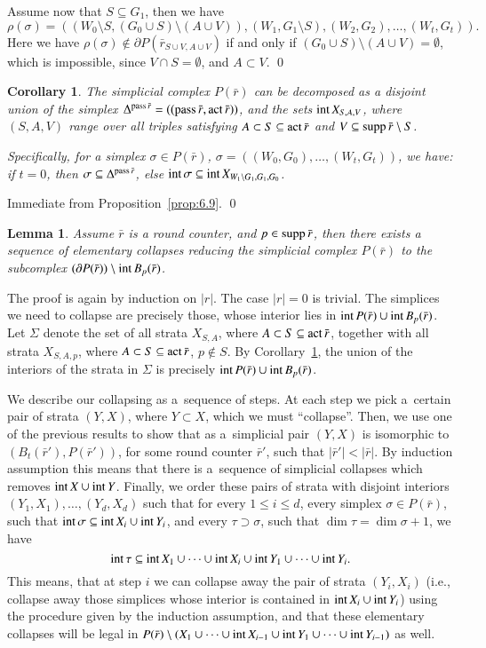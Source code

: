 \documentclass{amsart}[10pt]
\newtheorem{lm}[theorem]{Lemma}
\newtheorem{crl}[theorem]{Corollary}
\newcommand{\pr}{\nin{\bf Proof.} }
\newcommand{\act}{\text{\rm act}\,}
\newcommand{\da}{\Delta}
\newcommand{\es}{\emptyset}
\newcommand{\inte}{\text{\rm int}\,}
\newcommand{\pass}{\text{\rm pass}\,}
\newcommand{\sm}{\setminus}
\newcommand{\supp}{\text{\rm supp}\,}
\newcommand{\tr}{{\bar r}}
\numberwithin{equation}{section}
\numberwithin{figure}{section}
\numberwithin{table}{section}
\begin{document}
Assume now that $S\subseteq G_1$, then we have 
\[\rho(\sigma)=((W_0\sm S,(G_0\cup S)\sm(A\cup V)),(W_1,G_1\sm S),
(W_2,G_2),\dots,(W_t,G_t)).\] Here we have $\rho(\sigma)\notin\partial
P(\tr_{S\cup V,A\cup V})$ if and only if $(G_0\cup S)\sm(A\cup V)
=\es$, which is impossible, since $V\cap S=\es$, and $A\subset V$.
\qed

\begin{crl}\label{crl:strata}
The simplicial complex $P(\tr)$ can be decomposed as a disjoint union
of the simplex $\da^{\pass\tr}=((\pass\tr,\act\tr))$, and the sets
$\inte X_{S,A,V}$, where $(S,A,V)$ range over all triples satisfying
$A\subset S\subseteq\act\tr$ and $V\subseteq\supp\tr\sm S$.

Specifically, for a simplex $\sigma\in P(\tr)$,
$\sigma=((W_0,G_0),\dots,(W_t,G_t))$, we have: if $t=0$, then
$\sigma\subseteq\Delta^{\pass\tr}$, else $\inte\sigma\subseteq\inte
X_{W_1\sm G_1,G_1,G_0}$.
\end{crl}
\pr Immediate from Proposition~\ref{prop:6.9}.
\qed

\begin{lm}\label{lm:coll}
Assume $\tr$ is a round counter, and $p\in\supp\tr$, then there exists
a sequence of elementary collapses reducing the simplicial complex
$P(\tr)$ to the subcomplex $(\partial P(\tr))\sm\inte B_p(\tr)$.
\end{lm}
\pr The proof is again by induction on $|r|$. The case $|r|=0$ is
trivial. The simplices we need to collapse are precisely those, whose
interior lies in $\inte P(\tr)\cup\inte B_p(\tr)$. Let $\Sigma$ denote
the set of all strata $X_{S,A}$, where $A\subset S\subseteq\act\tr$,
together with all strata $X_{S,A,p}$, where $A\subset
S\subseteq\act\tr$, $p\notin S$. By Corollary~\ref{crl:strata}, the
union of the interiors of the strata in $\Sigma$ is precisely $\inte
P(\tr)\cup\inte B_p(\tr)$.

We describe our collapsing as a~sequence of steps. At each step we
pick a~certain pair of strata $(Y,X)$, where $Y\subset X$, which we
must ``collapse''. Then, we use one of the previous results to show
that as a~simplicial pair $(Y,X)$ is isomorphic to
$(B_t(\tr'),P(\tr'))$, for some round counter $\tr'$, such that
$|\tr'|<|\tr|$. By induction assumption this means that there is
a~sequence of simplicial collapses which removes $\inte X\cup\inte Y$.
Finally, we order these pairs of strata with disjoint interiors
$(Y_1,X_1),\dots,(Y_d,X_d)$ such that for every $1\leq i\leq d$, every
simplex $\sigma\in P(\tr)$, such that $\inte\sigma\subseteq\inte
X_i\cup\inte Y_i$, and every $\tau\supset\sigma$, such that
$\dim\tau=\dim\sigma+1$, we have
\begin{equation}\label{eq:intt}
\inte\tau\subseteq\inte X_1\cup\dots\cup\inte X_i\cup
\inte Y_1\cup\dots\cup\inte Y_i.
\end{equation}
This means, that at step $i$ we can
collapse away the pair of strata $(Y_i,X_i)$ (i.e., collapse away
those simplices whose interior is contained in $\inte X_i\cup\inte
Y_i$) using the procedure given by the induction assumption, and that
these elementary collapses will be legal in $P(\tr)\sm
(X_1\cup\dots\cup\inte X_{i-1}\cup\inte Y_1\cup\dots\cup\inte
Y_{i-1})$ as well.
\end{document}
